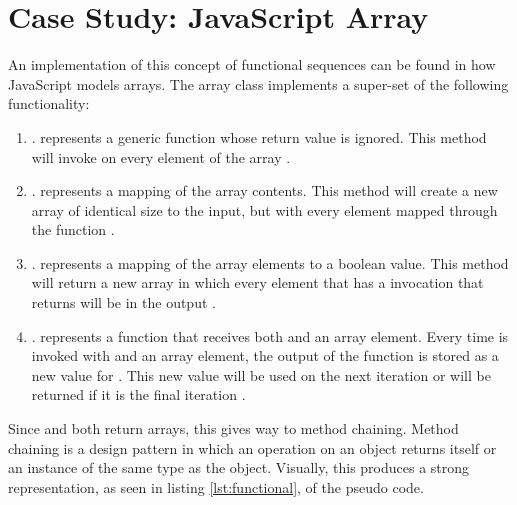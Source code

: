 \section{Case Study: JavaScript Array}

An implementation of this concept of functional sequences can be found in how JavaScript models arrays.  The array class implements a super-set of the following functionality:

\begin{enumerate}
  \item {}.   represents a generic function whose return value is ignored.  This method will invoke  on every element of the array \cite{arrayforeach16}.

  \item {}.   represents a mapping of the array contents.  This method will create a new array of identical size to the input, but with every element mapped through the  function \cite{arraymap16}.

  \item {}.   represents a mapping of the array elements to a boolean value.  This method will return a new array in which every element that has a  invocation that returns  will be in the output \cite{arrayfilter16}.

  \item {}.   represents a function that receives both  and an array element. Every time  is invoked with  and an array element, the output of the function is stored as a new value for .  This new value will be used on the next iteration or will be returned if it is the final iteration \cite{arrayreduce16}.

\end{enumerate}

Since  and  both return arrays, this gives way to method chaining. Method chaining is a design pattern in which an operation on an object returns itself or an instance of the same type as the object. Visually, this produces a strong representation, as seen in listing \ref{lst:functional}, of the pseudo code.

\begin{minipage}{\linewidth}

\end{minipage} 

